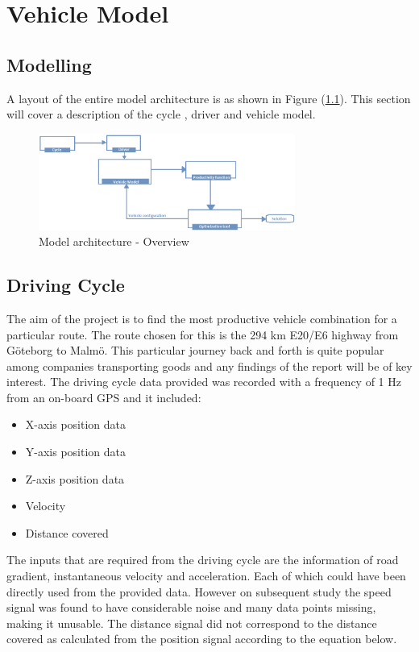 \documentclass[ExampleMasters.tex]{subfiles}
\begin{document}
\chapter{Vehicle Model}
\lipsum

\section{Modelling}

A layout of the entire model architecture is as shown in Figure (\ref{fig:architecture}). This section will cover a description of the cycle , driver and vehicle model. 

\begin{figure}[ht!]
	\begin{center}
		\includegraphics[width=0.75\textwidth]{figures/VehicleModel/architecture2.png}
	\end{center}
	\caption{Model architecture - Overview}
	\label{fig:architecture}
\end{figure}

\section{Driving Cycle}
\label{sec:drivingcycle}
The aim of the project is to find the most productive vehicle combination for a particular route. The route chosen for this is the 294 km E20/E6 highway from G\"oteborg to Malm\"o. This particular journey back and forth is quite popular among companies transporting goods and any findings of the report will be of key interest. 
The driving cycle data provided was recorded with a frequency of 1 Hz from an on-board GPS and it included:
\begin{itemize}
\item X-axis position data
\item Y-axis position data
\item Z-axis position data
\item Velocity
\item Distance covered
\end{itemize}

The inputs that are required from the driving cycle are the information of road gradient, instantaneous velocity and acceleration. Each of which could have been directly used from the provided data. However on subsequent study the speed signal was found to have considerable noise and many data points missing, making it unusable. The distance signal did not correspond to the distance covered as calculated from the position signal according to the equation below.
\end{document}
